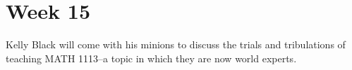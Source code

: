 \section{Week 15}
\label{sec:week-15}

Kelly Black will come with his minions to discuss the trials and tribulations of teaching MATH 1113--a topic in which they are now world experts.

